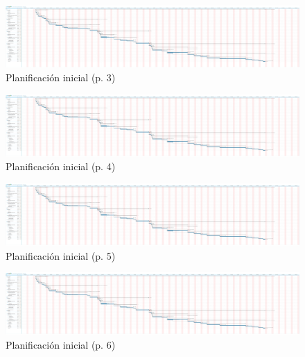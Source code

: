 \begin{figure}
 \centering
 \includegraphics[trim=61cm 5cm 149cm 0,clip=true,scale=0.45,keepaspectratio=true]{./imagenes/planificacion-inicial.png}
 \caption{Planificación inicial (p. 3)}
 \label{figura:PlanificacionInicialCompleta3}
\end{figure}

\begin{figure}
 \centering
 \includegraphics[trim=93cm 5cm 117cm 0,clip=true,scale=0.45,keepaspectratio=true]{./imagenes/planificacion-inicial.png}
 \caption{Planificación inicial (p. 4)}
 \label{figura:PlanificacionInicialCompleta4}
\end{figure}

\begin{figure}
 \centering
 \includegraphics[trim=125cm 5cm 85cm 0,clip=true,scale=0.45,keepaspectratio=true]{./imagenes/planificacion-inicial.png}
 \caption{Planificación inicial (p. 5)}
 \label{figura:PlanificacionInicialCompleta5}
\end{figure}

\begin{figure}
 \centering
 \includegraphics[trim=157cm 5cm 53cm 0,clip=true,scale=0.45,keepaspectratio=true]{./imagenes/planificacion-inicial.png}
 \caption{Planificación inicial (p. 6)}
 \label{figura:PlanificacionInicialCompleta6}
\end{figure}

